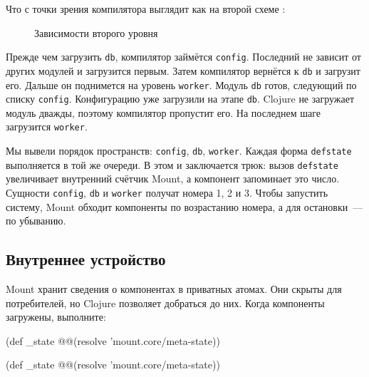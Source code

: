 \fi

\ifebook

\noindent
Что с точки зрения компилятора выглядит как на второй схеме
:

\begin{figure}[b!]
  \caption{Зависимости второго уровня}
  \label{fig:chart-sys-3}
\end{figure}

\fi

Прежде чем загрузить \verb|db|, компилятор займётся \verb|config|. Последний
не зависит от других модулей и загрузится первым. Затем компилятор вернётся к
\verb|db| и загрузит его. Дальше он поднимется на уровень
\verb|worker|. Модуль \verb|db| готов, следующий по списку
\verb|config|. Конфигурацию уже загрузили на этапе \verb|db|. Clojure не
загружает модуль дважды, поэтому компилятор пропустит его. На последнем шаге
загрузится \verb|worker|.


Мы вывели порядок пространств: \verb|config|, \verb|db|, \verb|worker|. Каждая
форма \verb|defstate| выполняется в той же очереди. В этом и заключается трюк:
вызов \verb|defstate| увеличивает внутренний счётчик Mount, а компонент
запоминает это число. Сущности \verb|config|, \verb|db| и \verb|worker| получат
номера 1, 2 и 3. Чтобы запустить систему, Mount обходит компоненты по
возрастанию номера, а для остановки~--- по убыванию.

\subsection{Внутреннее устройство}

Mount хранит сведения о компонентах в приватных атомах. Они скрыты для
потребителей, но Clojure позволяет добраться до них. Когда компоненты загружены,
выполните:

\ifnarrow

\begin{english}
  \begin{clojure}
(def _state
  @@(resolve 'mount.core/meta-state))
  \end{clojure}
\end{english}

\else

\begin{english}
  \begin{clojure}
(def _state @@(resolve 'mount.core/meta-state))
  \end{clojure}
\end{english}

